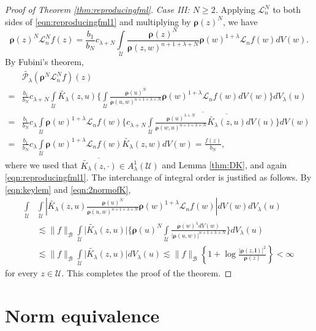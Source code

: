 \documentclass{amsart}
\numberwithin{equation}{section}
\newcommand{\bfL}{\mathcal{L}}
\newcommand{\calU}{\mathcal{U}}
\newcommand{\bfi}{\mathbf{i}}
\newcommand{\bfrho}{\boldsymbol{\rho}}
\newcommand{\calB}{\mathcal{B}}
\begin{document}
\begin{proof}[Proof of Theorem \ref{thm:reproducingfml}]
\medskip
\noindent\textit{Case III: $N\geq 2$.}
Applying $\bfL_n^N$ to both sides of \eqref{eqn:reproducingfml1} and multiplying by $\bfrho(z)^N$,
we have
\begin{equation*}\label{eqn:N-Df}
\bfrho(z)^N \bfL_n^N f(z) = \frac{b_1}{b_N}  c_{\lambda+N}
\int\limits_{\calU} \frac{\bfrho(z)^N} {\bfrho(z,w)^{n+1+\lambda+N}} \bfrho(w)^{1+\lambda} \bfL_n f(w) dV(w).
\end{equation*}
By Fubini's theorem,
\begin{align*}
&\widetilde{\mathcal{P}_\lambda} (\bfrho^N \bfL_n^N f) (z)\\
=& \frac{b_1}{b_N}  c_{\lambda+N} \int\limits_{\calU}  \widetilde{K_\lambda}(z,u) 
\bigg\{  \int\limits_{\calU} \frac {\bfrho(u)^N} {\bfrho(u,w)^{n+1+\lambda+N}} \bfrho(w)^{1+\lambda} \bfL_nf(w) dV(w) \bigg\}dV_\lambda(u)\\
=&\frac{b_1}{b_N} c_\lambda \int\limits_{\calU} \bfrho(w)^{1+\lambda} \bfL_nf(w)
\bigg\{ \overline{ c_{\lambda+N} \int\limits_{\calU} \frac {\bfrho(u)^{\lambda+N}} {\bfrho(w,u)^{n+1+\lambda+N}} \overline{\widetilde{K_\lambda}(z,u)} dV(u) \bigg\} }dV(w)\\
=& \frac{b_1}{b_N} c_\lambda \int\limits_{\calU} \bfrho(w)^{1+\lambda} \bfL_nf(w) \widetilde{K_\lambda}(z,w) dV(w) =  \frac{f(z)}{b_N},
\end{align*}
where we used that $\overline{\widetilde{K_\lambda}(z,\cdot)}\in A_\lambda^1(\calU)$ and Lemma \ref{thm:DK}, and again \eqref{eqn:reproducingfml1}.
The interchange of integral order is justified as follows. By \eqref{eqn:keylem} and \eqref{eqn:2normofK},
\begin{align*}
\int\limits_{\calU}& \int\limits_{\calU}   \left| \widetilde{K_\lambda}(z,u) \frac {\bfrho(u)^{N}} {\bfrho(u,w)^{n+1+\lambda+N}}  \bfrho(w)^{1+\lambda} \bfL_nf(w)\right| dV(w)dV_\lambda(u)\\
&\lesssim \|f\|_{\calB} \int\limits_{\calU} \big|\widetilde{K_\lambda}(z,u)\big| \bigg\{\bfrho(u)^{N}\int\limits_{\calU} \frac {\bfrho(w)^{\lambda}dV(w)} {|\bfrho(u,w)|^{n+1+\lambda+N}} \bigg\}  dV_\lambda(u)\\
&\lesssim \|f\|_{\calB} \int\limits_{\calU} \big|\widetilde{K_\lambda}(z,u)\big| dV_\lambda(u) \lesssim  \|f\|_{\calB}\left\{1 + \log \frac {|\bfrho(z,\bfi)|^2} {\bfrho(z)}\right\}< \infty
\end{align*}
for every $z\in\calU$. This completes the proof of the theorem.
 \end{proof}


\section{Norm equivalence}
\end{document}
